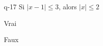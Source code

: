 \begin{truefalse}{q-17}
Si $|x-1|\leq 3$, alors $|x|\leq 2$
\item Vrai
\item* Faux
\end{truefalse}

